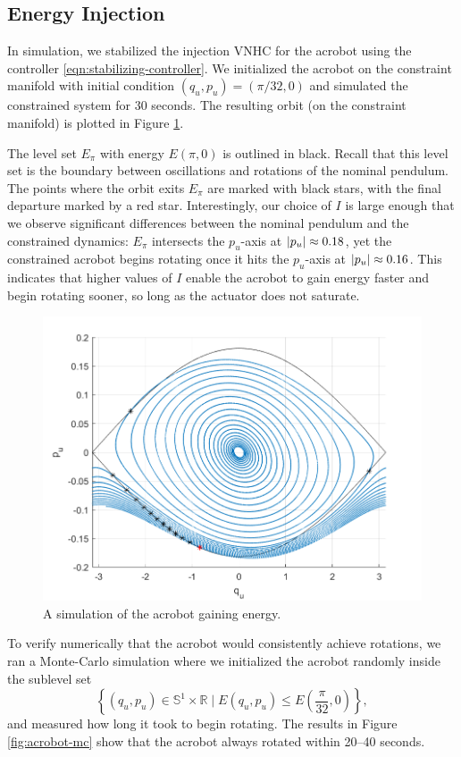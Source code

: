 \documentclass[journal,twoside,onecolumn,draftclsnofoot,web]{ieeecolor}
\DeclarePairedDelimiter{\abs}{\lvert}{\rvert}
\newcommand*{\R}{\mathbb{R}}
\newcommand*{\Sone}{\mathbb{S}^1}
\newcommand*{\SxR}{\Sone \times \R}
\begin{document}
{\subsection{Energy Injection}

In simulation, we stabilized the injection VNHC for the acrobot using the
controller \eqref{eqn:stabilizing-controller}.
We initialized the acrobot on the constraint manifold
with initial condition \((q_u,p_u) = \left(\pi/32,0 \right)\) and simulated the
constrained system for \(30\) seconds.
The resulting orbit (on the constraint manifold) is plotted in Figure
\ref{fig:acrobot-in-orbit}.

The level set \(E_\pi\) with energy \(E(\pi,0)\) is outlined in black.
Recall that this level set is the boundary between oscillations and rotations of the
nominal pendulum.
The points where the orbit exits \(E_\pi\) are marked with black stars,
with the final departure marked by a red star.
Interestingly, our choice of \(I\) is large enough that we observe significant
differences between the nominal pendulum and the constrained dynamics:
\(E_\pi\) intersects the \(p_u\)-axis at \(\abs{p_u} \approx 0.18\), yet the
constrained acrobot begins rotating once it hits the
\(p_u\)-axis at \(\abs{p_u} \approx 0.16\). 
This indicates that higher values of \(I\) enable the acrobot to gain energy
faster and begin rotating sooner, so long as the actuator does not saturate.

\begin{figure}[]
    \centering
    \includegraphics[width=0.8\linewidth]{acrobot_in_orbit.png}
    \caption{A simulation of the acrobot gaining energy.}
    \label{fig:acrobot-in-orbit}
\end{figure}

To verify numerically that the acrobot would consistently achieve rotations, we
ran a Monte-Carlo \cite{montecarlo} simulation where we initialized the acrobot
randomly inside the sublevel set
\[
    \left\{(q_u,p_u) \in \SxR \mid
    E(q_u,p_u) \leq E\left(\frac{\pi}{32},0\right)\right\}
    ,
\] 
and measured how long it took to begin rotating.
The results in Figure \ref{fig:acrobot-mc} show that
the acrobot always rotated within 20--40 seconds.

}
\end{document}
